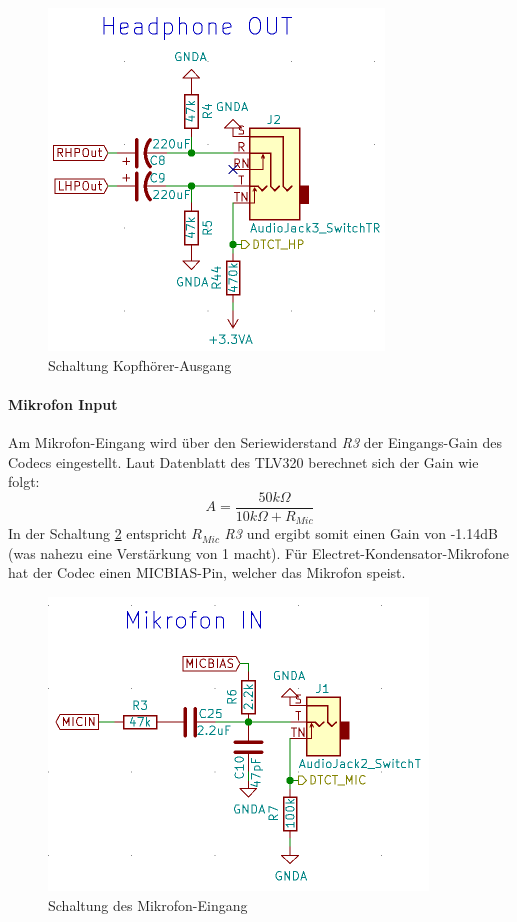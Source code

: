 \begin{figure} [H]
\begin{center}
 \includegraphics[scale=0.5]{../graphics/Schema_HPOUT.png}
 \caption{Schaltung Kopfhörer-Ausgang}
\label{fig:Schema_HPOUT}
\end{center}
\end{figure}


\paragraph{Mikrofon Input}
\label{par:MicIN}
Am Mikrofon-Eingang wird über den Seriewiderstand \textit{R3} der Eingangs-Gain des Codecs eingestellt. Laut Datenblatt des TLV320 \cite{tlv320} berechnet sich der Gain wie folgt:
\begin{equation}
A=\frac{50k\Omega}{10k\Omega+R_{Mic}}
\end{equation}
In der Schaltung \ref{fig:Schema_MicIN} entspricht $R_{Mic}$ \textit{R3} und ergibt somit einen Gain von -1.14dB (was nahezu eine Verstärkung von 1 macht).
Für Electret-Kondensator-Mikrofone hat der Codec einen MICBIAS-Pin, welcher das Mikrofon speist.
\begin{figure} [H]
\begin{center}
\includegraphics[scale=0.5]{../graphics/Schema_MicIN.png}
\caption{Schaltung des Mikrofon-Eingang}
\label{fig:Schema_MicIN}
\end{center}
\end{figure}

